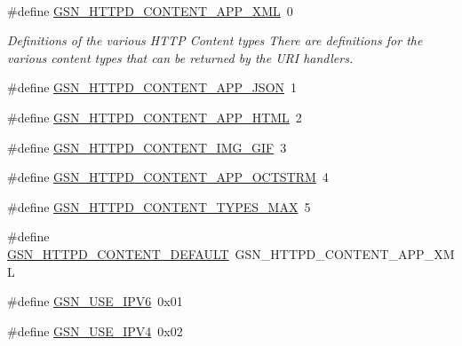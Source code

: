 \paragraph*{}
\begin{DoxyCompactItemize}
\item 
\#define \hyperlink{a00666_ga3004294919c3368623df769bbbc8e843}{GSN\_\-HTTPD\_\-CONTENT\_\-APP\_\-XML}~0
\begin{DoxyCompactList}\small\item\em Definitions of the various HTTP Content types There are definitions for the various content types that can be returned by the URI handlers. \end{DoxyCompactList}\item 
\#define \hyperlink{a00666_gadb38ca97283506dc6dc4fd43956d3f1b}{GSN\_\-HTTPD\_\-CONTENT\_\-APP\_\-JSON}~1
\item 
\#define \hyperlink{a00666_ga19c52b08a8222ee99b7bbfb85ce76435}{GSN\_\-HTTPD\_\-CONTENT\_\-APP\_\-HTML}~2
\item 
\#define \hyperlink{a00666_gac415fd2b4698131654ed19395cc07941}{GSN\_\-HTTPD\_\-CONTENT\_\-IMG\_\-GIF}~3
\item 
\#define \hyperlink{a00666_ga609fa91a2102bbc3f21d0fb9c2f492a9}{GSN\_\-HTTPD\_\-CONTENT\_\-APP\_\-OCTSTRM}~4
\item 
\#define \hyperlink{a00666_ga401387dbe1a0b570c26f495cbd92e53a}{GSN\_\-HTTPD\_\-CONTENT\_\-TYPES\_\-MAX}~5
\item 
\#define \hyperlink{a00666_gafd71fee266007e7dd46c2453ed351e18}{GSN\_\-HTTPD\_\-CONTENT\_\-DEFAULT}~GSN\_\-HTTPD\_\-CONTENT\_\-APP\_\-XML
\item 
\#define \hyperlink{a00666_ga96878e559c11f82897b9a300d88d376c}{GSN\_\-USE\_\-IPV6}~0x01
\item 
\#define \hyperlink{a00666_ga1de955d22e5f48865ad9e80c3bdcf945}{GSN\_\-USE\_\-IPV4}~0x02
\end{DoxyCompactItemize}

